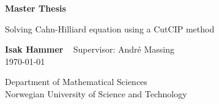 \documentclass[10pt]{article}
\begin{document}
\begin{titlepage}
    \begin{center}
        \vspace*{1cm}

        \Huge
        \textbf{Master Thesis}

        \vspace{0.5cm}
        \Large
        Solving Cahn-Hilliard equation using a CutCIP method   \\

        \vspace{1.5cm}

        \textbf{Isak Hammer} \
        \vspace{0.5cm}
        Supervisor: André Massing \\
        \vspace{0.5cm}
        \today


        \vfill

        \vspace{0.8cm}


        \Large
        Department of Mathematical Sciences\\
        Norwegian University of Science and Technology\\

    \end{center}

\end{titlepage}

    \newpage
    \label{sec:eyyy}


    
    
    
    

    \newpage
    \printbibliography
\end{document}
